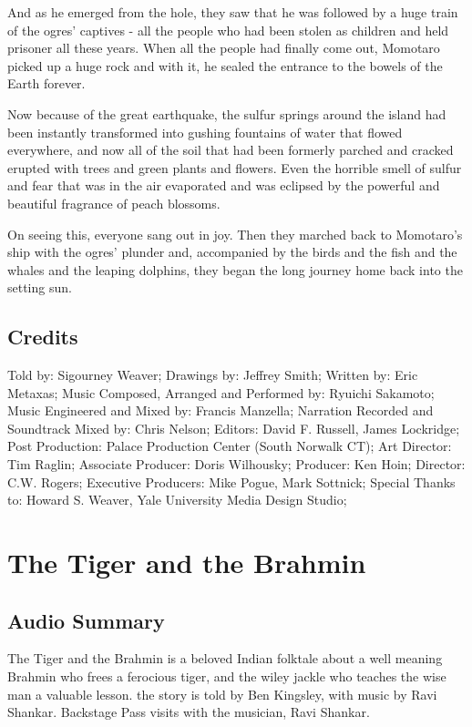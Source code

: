 And as he emerged from the hole, they saw that he was followed by a huge train of the ogres' captives - all the people who had been stolen as children and held prisoner all these years. When all the people had finally come out, Momotaro picked up a huge rock and with it, he sealed the entrance to the bowels of the Earth forever.

Now because of the great earthquake, the sulfur springs around the island had been instantly transformed into gushing fountains of water that flowed everywhere, and now all of the soil that had been formerly parched and cracked erupted with trees and green plants and flowers. Even the horrible smell of sulfur and fear that was in the air evaporated and was eclipsed by the powerful and beautiful fragrance of peach blossoms.

On seeing this, everyone sang out in joy. Then they marched back to Momotaro's ship with the ogres' plunder and, accompanied by the birds and the fish and the whales and the leaping dolphins, they began the long journey home back into the setting sun.

\subsection{Credits}

Told by: Sigourney Weaver;
Drawings by: Jeffrey Smith;
Written by: Eric Metaxas;
Music Composed, Arranged and Performed by: Ryuichi Sakamoto;
Music Engineered and Mixed by: Francis Manzella;
Narration Recorded and Soundtrack Mixed by: Chris Nelson;
Editors: David F. Russell, James Lockridge;
Post Production: Palace Production Center (South Norwalk CT);
Art Director: Tim Raglin;
Associate Producer: Doris Wilhousky;
Producer: Ken Hoin;
Director: C.W. Rogers;
Executive Producers: Mike Pogue, Mark Sottnick;
Special Thanks to: Howard S. Weaver, Yale University Media Design Studio;

\section{The Tiger and the Brahmin}

\subsection{Audio Summary}

The Tiger and the Brahmin is a beloved Indian folktale about a well meaning Brahmin who frees a ferocious tiger, and the wiley jackle who teaches the wise man a valuable lesson. the story is told by Ben Kingsley, with music by Ravi Shankar. Backstage Pass visits with the musician, Ravi Shankar.

